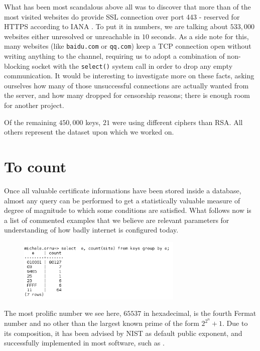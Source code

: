 What has been most scandalous above all was to discover that more than
 of the most visited websites do  provide SSL
connection over port 443 - reserved for HTTPS according to IANA
\cite{iana:ports}.
To put it in numbers, we are talking about $533, 000$ websites either
unresolved or unreachable in $10$ seconds.
As a side note for this, many websites (like \texttt{baidu.com} or
\texttt{qq.com}) keep a TCP connection open without writing anything to the
channel, requiring us to adopt a combination of non-blocking socket with the
\texttt{select()} system call in order to drop any empty communication.
It would be interesting to investigate more on these facts, asking ourselves how
many of those unsuccessful connections are actually wanted from the server, and
how many dropped for censorship reasons; there is enough room for another
project.

Of the remaining $450,000$ keys, $21$ were using different ciphers than RSA. All
others represent the dataset upon which we worked on.

\section{To count}

Once all valuable certificate informations have been stored inside a database,
almost any query can be performed to get a statistically valuable measure of
degree of magnitude to which some conditions are satisfied. What follows now is
a list of commented examples that we believe are relevant parameters for
understanding of how badly internet is configured today.


\begin{figure}[H]
  \includegraphics[width=0.7\textwidth]{e_count.png}
\end{figure}

The most prolific number we see here, $65537$ in hexadecimal, is the fourth
Fermat number and no other than the largest known prime of the form $2^{2^n} +
1$. Due to its composition, it has been advised by NIST as default public
exponent, and successfully implemented in most software, such as \openssl\!.

